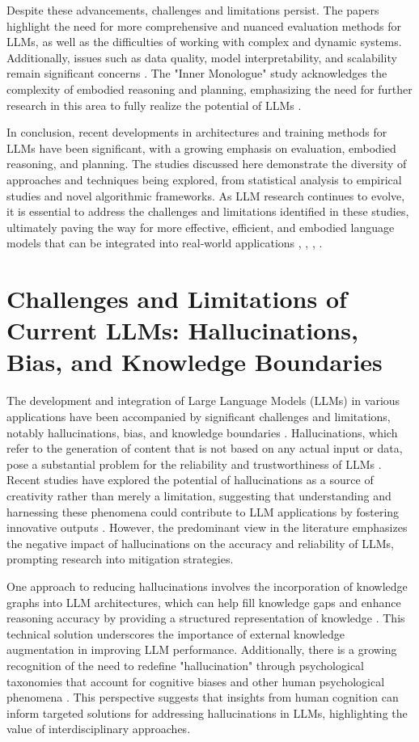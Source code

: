 \documentclass[conference]{IEEEtran}
\begin{document}
Despite these advancements, challenges and limitations persist. The papers highlight the need for more comprehensive and nuanced evaluation methods for LLMs, as well as the difficulties of working with complex and dynamic systems. Additionally, issues such as data quality, model interpretability, and scalability remain significant concerns \cite{b2}. The "Inner Monologue" study acknowledges the complexity of embodied reasoning and planning, emphasizing the need for further research in this area to fully realize the potential of LLMs \cite{b4}.

In conclusion, recent developments in architectures and training methods for LLMs have been significant, with a growing emphasis on evaluation, embodied reasoning, and planning. The studies discussed here demonstrate the diversity of approaches and techniques being explored, from statistical analysis to empirical studies and novel algorithmic frameworks. As LLM research continues to evolve, it is essential to address the challenges and limitations identified in these studies, ultimately paving the way for more effective, efficient, and embodied language models that can be integrated into real-world applications \cite{b1}, \cite{b2}, \cite{b3}, \cite{b4}.

\section{Challenges and Limitations of Current LLMs: Hallucinations, Bias, and Knowledge Boundaries}
The development and integration of Large Language Models (LLMs) in various applications have been accompanied by significant challenges and limitations, notably hallucinations, bias, and knowledge boundaries \cite{b1}. Hallucinations, which refer to the generation of content that is not based on any actual input or data, pose a substantial problem for the reliability and trustworthiness of LLMs \cite{b2}. Recent studies have explored the potential of hallucinations as a source of creativity rather than merely a limitation, suggesting that understanding and harnessing these phenomena could contribute to LLM applications by fostering innovative outputs \cite{b3}. However, the predominant view in the literature emphasizes the negative impact of hallucinations on the accuracy and reliability of LLMs, prompting research into mitigation strategies.

One approach to reducing hallucinations involves the incorporation of knowledge graphs into LLM architectures, which can help fill knowledge gaps and enhance reasoning accuracy by providing a structured representation of knowledge \cite{b4}. This technical solution underscores the importance of external knowledge augmentation in improving LLM performance. Additionally, there is a growing recognition of the need to redefine "hallucination" through psychological taxonomies that account for cognitive biases and other human psychological phenomena \cite{b5}. This perspective suggests that insights from human cognition can inform targeted solutions for addressing hallucinations in LLMs, highlighting the value of interdisciplinary approaches.
\end{document}
